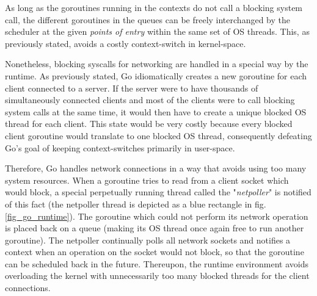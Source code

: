 As long as the goroutines running in the contexts do not call a blocking system call, the different goroutines in the queues can be freely interchanged by the scheduler at the given \textit{points of entry} within the same set of OS threads. This, as previously stated, avoids a costly context-switch in kernel-space. 

Nonetheless, blocking syscalls for networking are handled in a special way by the runtime. As previously stated, Go idiomatically creates a new goroutine for each client connected to a server. If the server were to have thousands of simultaneously connected clients and most of the clients were to call blocking system calls at the same time, it would then have to create a unique blocked OS thread for each client. This state would be very costly because every blocked client goroutine would translate to one blocked OS thread, consequently defeating Go's goal of keeping context-switches primarily in user-space.

Therefore, Go handles network connections in a way that avoids using too many system resources. When a goroutine tries to read from a client socket which would block, a special perpetually running thread called the "\textit{netpoller}" is notified of this fact \cite{Morsing2013_2} (the netpoller thread is depicted as a blue rectangle in fig. \ref{fig_go_runtime}). The goroutine which could not perform its network operation is placed back on a queue (making its OS thread once again free to run another goroutine). The netpoller continually polls all network sockets and notifies a context when an operation on the socket would not block, so that the goroutine can be scheduled back in the future. Thereupon, the runtime environment avoids overloading the kernel with unnecessarily too many blocked threads for the client connections.